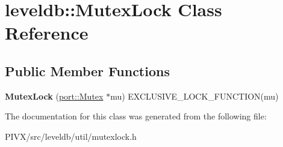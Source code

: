 \hypertarget{classleveldb_1_1_mutex_lock}{}\section{leveldb\+:\+:Mutex\+Lock Class Reference}
\label{classleveldb_1_1_mutex_lock}
\subsection*{Public Member Functions}
\begin{DoxyCompactItemize}
\item 
\mbox{\label{classleveldb_1_1_mutex_lock_a1501eaa9a404460e06d47468e0e04ef2}} 
{\bfseries Mutex\+Lock} (\mbox{\hyperlink{classleveldb_1_1port_1_1_mutex}{port\+::\+Mutex}} $\ast$mu) E\+X\+C\+L\+U\+S\+I\+V\+E\+\_\+\+L\+O\+C\+K\+\_\+\+F\+U\+N\+C\+T\+I\+ON(mu)
\end{DoxyCompactItemize}


The documentation for this class was generated from the following file\+:\begin{DoxyCompactItemize}
\item 
P\+I\+V\+X/src/leveldb/util/mutexlock.\+h\end{DoxyCompactItemize}
